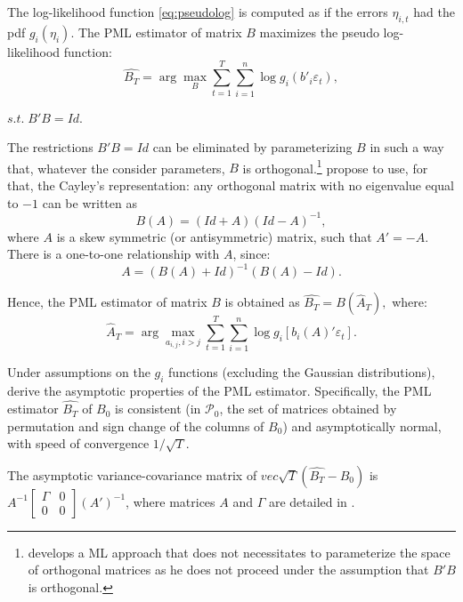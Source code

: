 \documentclass[
  12pt,
]{book}
\theoremstyle{definition}
\theoremstyle{definition}
\theoremstyle{definition}
\theoremstyle{definition}
\theoremstyle{remark}
\begin{document}
The log-likelihood function \eqref{eq:pseudolog} is computed as if the errors \(\eta_{i,t}\) had the pdf \(g_i (\eta_i)\). The PML estimator of matrix \(B\) maximizes the pseudo log-likelihood function:
\begin{equation}
\widehat{B_T} = \arg \max_B \sum^T_{t=1} \sum^n_{i=1} \log g_i (b'_i \varepsilon_t),\label{eq:optimprob}
\end{equation}

\centerline{$s.t. \;B'B = Id.$}

The restrictions \(B'B = Id\) can be eliminated by parameterizing \(B\) in such a way that, whatever the consider parameters, \(B\) is orthogonal.\footnote{\citet{Jarocinski_2021} develops a ML approach that does not necessitates to parameterize the space of orthogonal matrices as he does not proceed under the assumption that \(B'B\) is orthogonal.} \citet{Gourieroux_Monfort_Renne_2017} propose to use, for that, the Cayley's representation: any orthogonal matrix with no eigenvalue equal to \(-1\) can be written as
\begin{equation}
B(A) = (Id+A) (Id-A)^{-1},
\end{equation}
where \(A\) is a skew symmetric (or antisymmetric) matrix, such that \(A'=-A\). There is a one-to-one relationship with \(A\), since:
\begin{equation}
A = (B(A)+Id)^{-1} (B(A)-Id).
\end{equation}

Hence, the PML estimator of matrix \(B\) is obtained as \(\widehat{B_T} = B(\hat{A}_T),\) where:
\begin{equation}
\hat{A}_T = \arg \max_{a_{i,j}, i>j} \sum^T_{t=1} \sum^n_{i=1} \log g_i [b_i (A)' \varepsilon_t].\label{eq:optimprob2}
\end{equation}

Under assumptions on the \(g_i\) functions (excluding the Gaussian distributions), \citet{Gourieroux_Monfort_Renne_2017} derive the asymptotic properties of the PML estimator. Specifically, the PML estimator \(\widehat{B_T}\) of \(B_0\) is consistent (in \(\mathcal{P}_0\), the set of matrices obtained by permutation and sign change of the columns of \(B_0\)) and asymptotically normal, with speed of convergence \(1/\sqrt{T}\).

The asymptotic variance-covariance matrix of \(vec \sqrt{T} (\widehat{B_T} - B_0)\) is \(A^{-1} \left[\begin{array}{cc} \Gamma & 0 \\ 0 & 0 \end{array} \right] (A')^{-1}\), where matrices \(A\) and \(\Gamma\) are detailed in \citet{Gourieroux_Monfort_Renne_2017}.
\end{document}
